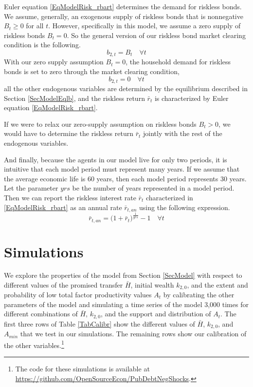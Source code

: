 \documentclass[letterpaper,12pt]{article}
\theoremstyle{definition}
\begin{document}
\begin{spacing}{1.5}
    Euler equation \eqref{EqModelRisk_rbart} determines the demand for riskless bonds. We assume, generally, an exogenous supply of riskless bonds that is nonnegative $B_t\geq 0$ for all $t$. However, specifically in this model, we assume a zero supply of riskless bonds $B_t=0$. So the general version of our riskless bond market clearing condition is the following.
    \begin{equation}\label{EqModelMC_B_gen}
      b_{2,t} = B_t \quad\forall t
    \end{equation}
    With our zero supply assumption $B_t = 0$, the household demand for riskless bonds is set to zero through the market clearing condition,
    \begin{equation}\label{EqModelMC_B_zero}
      b_{2,t} = 0 \quad\forall t
    \end{equation}
    all the other endogenous variables are determined by the equilibrium described in Section \ref{SecModelEqlb}, and the riskless return $\bar{r}_t$ is characterized by Euler equation \eqref{EqModelRisk_rbart}.

    If we were to relax our zero-supply assumption on riskless bonds $B_t>0$, we would have to determine the riskless return $\bar{r}_t$ jointly with the rest of the endogenous variables.

    And finally, because the agents in our model live for only two periods, it is intuitive that each model period must represent many years. If we assume that the average economic life is 60 years, then each model period represents 30 years. Let the parameter $yrs$ be the number of years represented in a model period. Then we can report the riskless interest rate $\bar{r}_t$ characterized in \eqref{EqModelRisk_rbart} as an annual rate $\bar{r}_{t,an}$ using the following expression.
    \begin{equation}\label{}
      \bar{r}_{t,an} = \bigl(1 + \bar{r}_t\bigr)^\frac{1}{yrs} - 1 \quad\forall t
    \end{equation}


\section{Simulations}\label{SecSims}

  We explore the properties of the model from Section \ref{SecModel} with respect to different values of the promised transfer $\bar{H}$, initial wealth $k_{2,0}$, and the extent and probability of low total factor productivity values $A_t$ by calibrating the other parameters of the model and simulating a time series of the model 3,000 times for different combinations of $\bar{H}$, $k_{2,0}$, and the support and distribution of $A_t$. The first three rows of Table \ref{TabCalibr} show the different values of $\bar{H}$, $k_{2,0}$, and $A_{min}$ that we test in our simulations. The remaining rows show our calibration of the other variables.\footnote{The code for these simulations is available at \href{https://github.com/OpenSourceEcon/PubDebtNegShocks}{https://github.com/OpenSourceEcon/PubDebtNegShocks}.}


\end{spacing}
\end{document}
